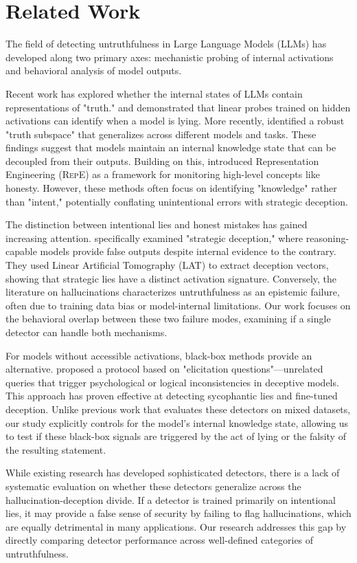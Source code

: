 \section{Related Work}
\label{sec:related_work}

The field of detecting untruthfulness in Large Language Models (LLMs) has developed along two primary axes: mechanistic probing of internal activations and behavioral analysis of model outputs.

Recent work has explored whether the internal states of LLMs contain representations of "truth." \citet{burns2022discovering} and \citet{azaria2023the} demonstrated that linear probes trained on hidden activations can identify when a model is lying. More recently, \citet{burger2024truth} identified a robust "truth subspace" that generalizes across different models and tasks. These findings suggest that models maintain an internal knowledge state that can be decoupled from their outputs. Building on this, \citet{zou2023representation} introduced Representation Engineering (\textsc{RepE}) as a framework for monitoring high-level concepts like honesty. However, these methods often focus on identifying "knowledge" rather than "intent," potentially conflating unintentional errors with strategic deception.

The distinction between intentional lies and honest mistakes has gained increasing attention. \citet{wang2025when} specifically examined "strategic deception," where reasoning-capable models provide false outputs despite internal evidence to the contrary. They used Linear Artificial Tomography (\textsc{LAT}) to extract deception vectors, showing that strategic lies have a distinct activation signature. Conversely, the literature on hallucinations \cite{lin2021truthfulqa} characterizes untruthfulness as an epistemic failure, often due to training data bias or model-internal limitations. Our work focuses on the behavioral overlap between these two failure modes, examining if a single detector can handle both mechanisms.

For models without accessible activations, black-box methods provide an alternative. \citet{pacchiardi2023how} proposed a protocol based on "elicitation questions"—unrelated queries that trigger psychological or logical inconsistencies in deceptive models. This approach has proven effective at detecting sycophantic lies and fine-tuned deception. Unlike previous work that evaluates these detectors on mixed datasets, our study explicitly controls for the model's internal knowledge state, allowing us to test if these black-box signals are triggered by the act of lying or the falsity of the resulting statement.

While existing research has developed sophisticated detectors, there is a lack of systematic evaluation on whether these detectors generalize across the hallucination-deception divide. If a detector is trained primarily on intentional lies, it may provide a false sense of security by failing to flag hallucinations, which are equally detrimental in many applications. Our research addresses this gap by directly comparing detector performance across well-defined categories of untruthfulness.

